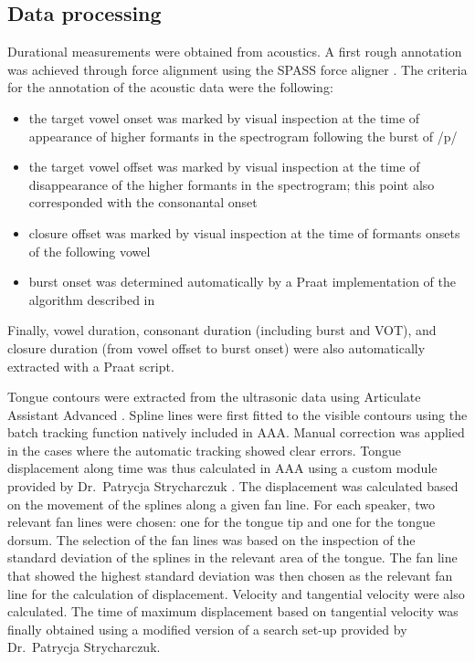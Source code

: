 \documentclass[]{elsarticle}
\providecommand{\tightlist}{%
  \setlength{\itemsep}{0pt}\setlength{\parskip}{0pt}}
\begin{document}
\subsection{Data processing}\label{data-processing}

Durational measurements were obtained from acoustics. A first rough
annotation was achieved through force alignment using the SPASS force
aligner \citep{bigi2015}. The criteria for the annotation of the
acoustic data were the following:

\begin{itemize}
\tightlist
\item
  the target vowel onset was marked by visual inspection at the time of
  appearance of higher formants in the spectrogram following the burst
  of /p/
\item
  the target vowel offset was marked by visual inspection at the time of
  disappearance of the higher formants in the spectrogram; this point
  also corresponded with the consonantal onset
\item
  closure offset was marked by visual inspection at the time of formants
  onsets of the following vowel
\item
  burst onset was determined automatically by a Praat implementation of
  the algorithm described in \citet{ananthapadmanabha2014}
\end{itemize}

Finally, vowel duration, consonant duration (including burst and VOT),
and closure duration (from vowel offset to burst onset) were also
automatically extracted with a Praat script.

Tongue contours were extracted from the ultrasonic data using Articulate
Assistant Advanced \citep[AAA,][]{articulate2011}. Spline lines were
first fitted to the visible contours using the batch tracking function
natively included in AAA. Manual correction was applied in the cases
where the automatic tracking showed clear errors. Tongue displacement
along time was thus calculated in AAA using a custom module provided by
Dr.~Patrycja Strycharczuk \citep{Strycharczuk2015}. The displacement was
calculated based on the movement of the splines along a given fan line.
For each speaker, two relevant fan lines were chosen: one for the tongue
tip and one for the tongue dorsum. The selection of the fan lines was
based on the inspection of the standard deviation of the splines in the
relevant area of the tongue. The fan line that showed the highest
standard deviation was then chosen as the relevant fan line for the
calculation of displacement. Velocity and tangential velocity were also
calculated. The time of maximum displacement based on tangential
velocity was finally obtained using a modified version of a search
set-up provided by Dr.~Patrycja Strycharczuk.
\end{document}
